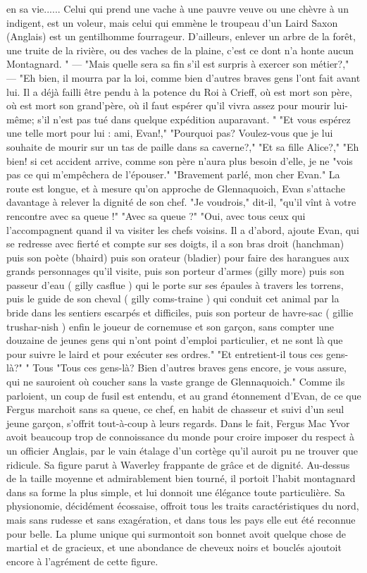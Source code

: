 en sa vie...... Celui qui prend une vache à
une pauvre veuve ou une chèvre à un indigent, est un voleur, mais celui qui emmène le troupeau d’un Laird Saxon (Anglais) est un gentilhomme fourrageur. D’ailleurs, enlever un arbre de la forêt, une
truite de la rivière, ou des vaches de la
plaine, c’est ce dont n’a honte aucun Montagnard. "
— "Mais quelle sera sa fin s’il est surpris
à exercer son métier?,"
— "Eh bien, il mourra par la loi, comme
bien d’autres braves gens l’ont fait avant
lui. Il a déjà failli être pendu à la potence
du Roi à Crieff, où est mort son père, où
est mort son grand’père, où il faut espérer qu’il vivra assez pour mourir lui-même;
s’il n’est pas tué dans quelque expédition
auparavant. "
"Et vous espérez une telle mort pour
lui : ami, Evan!,"
"Pourquoi pas? Voulez-vous que je lui
souhaite de mourir sur un tas de paille
dans sa caverne?,"
"Et sa fille Alice?,"
"Eh bien! si cet accident arrive, comme
son père n’aura plus besoin d’elle, je ne\setcounter{page}{112} "vois pas ce qui m'empêchera de l'épouser."
"Bravement parlé, mon cher Evan."
La route est longue, et à mesure qu'on approche de Glennaquoich, Evan s'attache davantage à relever la dignité de son chef.
"Je voudrois," dit-il, "qu'il vînt à votre rencontre avec sa queue !"
"Avec sa queue ?"
"Oui, avec tous ceux qui l'accompagnent quand il va visiter les chefs voisins. Il a d'abord, ajoute Evan, qui se redresse avec fierté et compte sur ses doigts, il a son bras droit (hanchman) puis son poète (bhaird) puis son orateur (bladier) pour faire des harangues aux grands personnages qu'il visite, puis son porteur d'armes (gilly more) puis son passeur d'eau ( gilly casflue ) qui le porte sur ses épaules à travers les torrens, puis le guide de son cheval ( gilly coms-traine ) qui conduit cet animal par la bride dans les sentiers escarpés et difficiles, puis son porteur de havre-sac ( gillie trushar-nish ) enfin le joueur de cornemuse et son garçon, sans compter une douzaine de jeunes gens qui n'ont point d'emploi particulier, et ne sont là que pour suivre le laird et pour exécuter ses ordres."
"Et entretient-il tous ces gens-là?"
" Tous\setcounter{page}{113} "Tous ces gens-là? Bien d'autres braves gens encore, je vous assure, qui ne sauroient où coucher sans la vaste grange de Glennaquoich."
Comme ils parloient, un coup de fusil est entendu, et au grand étonnement d'Evan, de ce que Fergus marchoit sans sa queue, ce chef, en habit de chasseur et suivi d'un seul jeune garçon, s'offrit tout-à-coup à leurs regards.
Dans le fait, Fergus Mac Yvor avoit beaucoup trop de connoissance du monde pour croire imposer du respect à un officier Anglais, par le vain étalage d'un cortège qu'il auroit pu ne trouver que ridicule. Sa figure parut à Waverley frappante de grâce et de dignité. Au-dessus de la taille moyenne et admirablement bien tourné, il portoit l'habit montagnard dans sa forme la plus simple, et lui donnoit une élégance toute particulière. Sa physionomie, décidément écossaise, offroit tous les traits caractéristiques du nord, mais sans rudesse et sans exagération, et dans tous les pays elle eut été reconnue pour belle. La plume unique qui surmontoit son bonnet avoit quelque chose de martial et de gracieux, et une abondance\setcounter{page}{114} de cheveux noirs et bouclés ajoutoit encore à l'agrément de cette figure.
